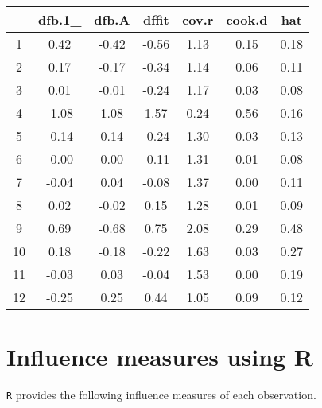 \documentclass[12pt, a4paper]{article}
\begin{document}
\begin{table}[ht]
	\begin{center}
		\begin{tabular}{|c|c|c|c|c|c|c|}
			\hline
			& dfb.1\_ & dfb.A & dffit & cov.r & cook.d & hat \\
			\hline
			1 & 0.42 & -0.42 & -0.56 & 1.13 & 0.15 & 0.18 \\
			2 & 0.17 & -0.17 & -0.34 & 1.14 & 0.06 & 0.11 \\
			3 & 0.01 & -0.01 & -0.24 & 1.17 & 0.03 & 0.08 \\
			4 & -1.08 & 1.08 & 1.57 & 0.24 & 0.56 & 0.16 \\
			5 & -0.14 & 0.14 & -0.24 & 1.30 & 0.03 & 0.13 \\
			6 & -0.00 & 0.00 & -0.11 & 1.31 & 0.01 & 0.08 \\
			7 & -0.04 & 0.04 & -0.08 & 1.37 & 0.00 & 0.11 \\
			8 & 0.02 & -0.02 & 0.15 & 1.28 & 0.01 & 0.09 \\
			9 & 0.69 & -0.68 & 0.75 & 2.08 & 0.29 & 0.48 \\
			10 & 0.18 & -0.18 & -0.22 & 1.63 & 0.03 & 0.27 \\
			11 & -0.03 & 0.03 & -0.04 & 1.53 & 0.00 & 0.19 \\
			12 & -0.25 & 0.25 & 0.44 & 1.05 & 0.09 & 0.12 \\
			\hline
		\end{tabular}
	\end{center}
\end{table}




\section{Influence measures using R} %
\texttt{R} provides the following influence measures of each observation.

\end{document}
